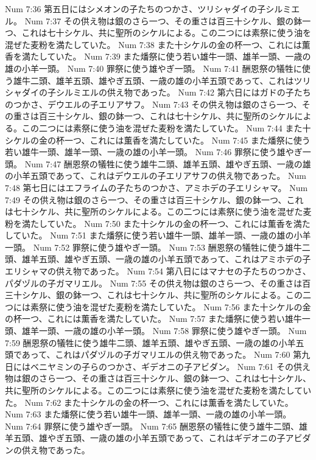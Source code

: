Num 7:36  第五日にはシメオンの子たちのつかさ、ツリシャダイの子シルミエル。
Num 7:37  その供え物は銀のさら一つ、その重さは百三十シケル、銀の鉢一つ、これは七十シケル、共に聖所のシケルによる。この二つには素祭に使う油を混ぜた麦粉を満たしていた。
Num 7:38  また十シケルの金の杯一つ、これには薫香を満たしていた。
Num 7:39  また燔祭に使う若い雄牛一頭、雄羊一頭、一歳の雄の小羊一頭。
Num 7:40  罪祭に使う雄やぎ一頭。
Num 7:41  酬恩祭の犠牲に使う雄牛二頭、雄羊五頭、雄やぎ五頭、一歳の雄の小羊五頭であって、これはツリシャダイの子シルミエルの供え物であった。
Num 7:42  第六日にはガドの子たちのつかさ、デウエルの子エリアサフ。
Num 7:43  その供え物は銀のさら一つ、その重さは百三十シケル、銀の鉢一つ、これは七十シケル、共に聖所のシケルによる。この二つには素祭に使う油を混ぜた麦粉を満たしていた。
Num 7:44  また十シケルの金の杯一つ、これには薫香を満たしていた。
Num 7:45  また燔祭に使う若い雄牛一頭、雄羊一頭、一歳の雄の小羊一頭。
Num 7:46  罪祭に使う雄やぎ一頭。
Num 7:47  酬恩祭の犠牲に使う雄牛二頭、雄羊五頭、雄やぎ五頭、一歳の雄の小羊五頭であって、これはデウエルの子エリアサフの供え物であった。
Num 7:48  第七日にはエフライムの子たちのつかさ、アミホデの子エリシャマ。
Num 7:49  その供え物は銀のさら一つ、その重さは百三十シケル、銀の鉢一つ、これは七十シケル、共に聖所のシケルによる。この二つには素祭に使う油を混ぜた麦粉を満たしていた。
Num 7:50  また十シケルの金の杯一つ、これには薫香を満たしていた。
Num 7:51  また燔祭に使う若い雄牛一頭、雄羊一頭、一歳の雄の小羊一頭。
Num 7:52  罪祭に使う雄やぎ一頭。
Num 7:53  酬恩祭の犠牲に使う雄牛二頭、雄羊五頭、雄やぎ五頭、一歳の雄の小羊五頭であって、これはアミホデの子エリシャマの供え物であった。
Num 7:54  第八日にはマナセの子たちのつかさ、パダヅルの子ガマリエル。
Num 7:55  その供え物は銀のさら一つ、その重さは百三十シケル、銀の鉢一つ、これは七十シケル、共に聖所のシケルによる。この二つには素祭に使う油を混ぜた麦粉を満たしていた。
Num 7:56  また十シケルの金の杯一つ、これには薫香を満たしていた。
Num 7:57  また燔祭に使う若い雄牛一頭、雄羊一頭、一歳の雄の小羊一頭。
Num 7:58  罪祭に使う雄やぎ一頭。
Num 7:59  酬恩祭の犠牲に使う雄牛二頭、雄羊五頭、雄やぎ五頭、一歳の雄の小羊五頭であって、これはパダヅルの子ガマリエルの供え物であった。
Num 7:60  第九日にはベニヤミンの子らのつかさ、ギデオニの子アビダン。
Num 7:61  その供え物は銀のさら一つ、その重さは百三十シケル、銀の鉢一つ、これは七十シケル、共に聖所のシケルによる。この二つには素祭に使う油を混ぜた麦粉を満たしていた。
Num 7:62  また十シケルの金の杯一つ、これには薫香を満たしていた。
Num 7:63  また燔祭に使う若い雄牛一頭、雄羊一頭、一歳の雄の小羊一頭。
Num 7:64  罪祭に使う雄やぎ一頭。
Num 7:65  酬恩祭の犠牲に使う雄牛二頭、雄羊五頭、雄やぎ五頭、一歳の雄の小羊五頭であって、これはギデオニの子アビダンの供え物であった。
